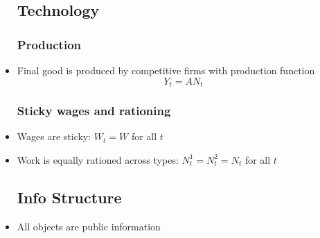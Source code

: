 \documentclass{article}
\begin{document}
\begin{itemize}
\subsection{Technology}
\subsubsection{Production}
\item Final good is produced by competitive firms with production function
$$
Y_t = A N_t
$$
\subsubsection{Sticky wages and rationing}
\item Wages are sticky: $W_t = W$ for all $t$
\item Work is equally rationed across types: $N_t^1 = N_t^2 = N_t$ for all $t$
\subsection{Info Structure}
\item All objects are public information

\end{itemize}
\end{document}
